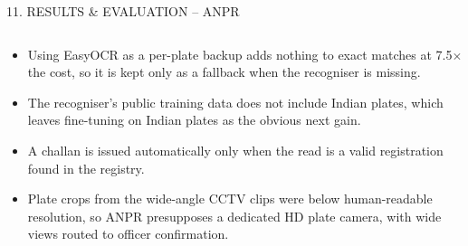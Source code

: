 \documentclass[aspectratio=169,10pt,t]{beamer}
\begin{document}
\begin{frame}{11. RESULTS \& EVALUATION -- ANPR}
\begin{columns}[T,onlytextwidth]
\begin{column}{0.45\textwidth}
\begin{itemize}
        the character error rate and cuts no-reads from 11.0\% to 1.7\%, at roughly a tenth of the time per plate.
  \item Using EasyOCR as a per-plate backup adds nothing to exact matches at 7.5$\times$ the cost, so it is kept only as
        a fallback when the recogniser is missing.
  \item The recogniser's public training data does not include Indian plates, which leaves fine-tuning on Indian
        plates as the obvious next gain.
  \item A challan is issued automatically only when the read is a valid registration found in the registry.
  \item Plate crops from the wide-angle CCTV clips were below human-readable resolution, so ANPR presupposes a dedicated
        HD plate camera, with wide views routed to officer confirmation.
\end{itemize}
\end{column}
\end{columns}
\end{frame}
\end{document}
